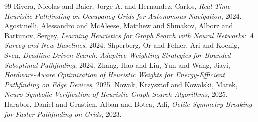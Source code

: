 \documentclass[conference]{IEEEtran}
\begin{document}
\begin{thebibliography}{99}
   Rivera, Nicolas and Baier, Jorge A. and Hernandez, Carlos, \textit{Real-Time Heuristic Pathfinding on Occupancy Grids for Autonomous Navigation}, 2024.
   Agostinelli, Alessandro and McAleese, Matthew and Shmakov, Alborz and Bartunov, Sergey, \textit{Learning Heuristics for Graph Search with Neural Networks: A Survey and New Baselines}, 2024.
   Shperberg, Or and Felner, Ari and Koenig, Sven, \textit{Deadline-Driven Search: Adaptive Weighting Strategies for Bounded-Suboptimal Pathfinding}, 2024.
   Zhang, Hao and Liu, Yun and Wang, Jiayi, \textit{Hardware-Aware Optimization of Heuristic Weights for Energy-Efficient Pathfinding on Edge Devices}, 2025.
   Nowak, Krzysztof and Kowalski, Marek, \textit{Neuro-Symbolic Verification of Heuristic Graph Search Algorithms}, 2025.
   Harabor, Daniel and Grastien, Alban and Botea, Adi, \textit{Octile Symmetry Breaking for Faster Pathfinding on Grids}, 2023.
\end{thebibliography}
\end{document}
